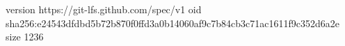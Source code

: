 version https://git-lfs.github.com/spec/v1
oid sha256:e24543dfdbd5b72b870f0ffd3a0b14060af9c7b84cb3c71ac1611f9c352d6a2e
size 1236

